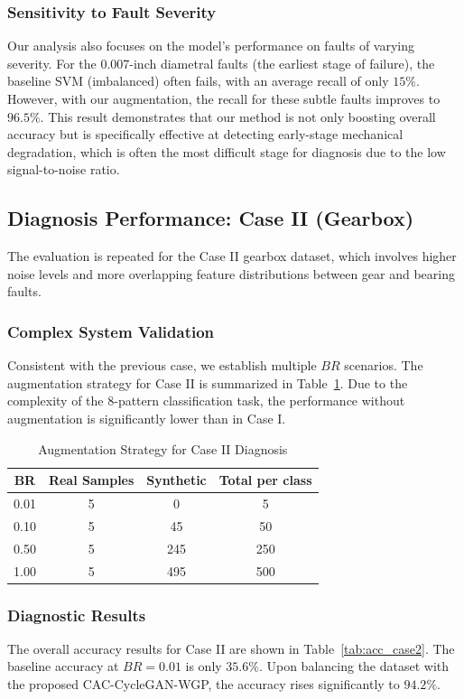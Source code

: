 \subsubsection{Sensitivity to Fault Severity}
Our analysis also focuses on the model's performance on faults of varying severity. For the 0.007-inch diametral faults (the earliest stage of failure), the baseline SVM (imbalanced) often fails, with an average recall of only $15\%$. However, with our augmentation, the recall for these subtle faults improves to $96.5\%$. This result demonstrates that our method is not only boosting overall accuracy but is specifically effective at detecting early-stage mechanical degradation, which is often the most difficult stage for diagnosis due to the low signal-to-noise ratio.

\subsection{Diagnosis Performance: Case II (Gearbox)}
The evaluation is repeated for the Case II gearbox dataset, which involves higher noise levels and more overlapping feature distributions between gear and bearing faults.

\subsubsection{Complex System Validation}
Consistent with the previous case, we establish multiple $BR$ scenarios. The augmentation strategy for Case II is summarized in Table~\ref{tab:aug_case2}. Due to the complexity of the 8-pattern classification task, the performance without augmentation is significantly lower than in Case I.

\begin{table}[htbp]
\centering
\caption{Augmentation Strategy for Case II Diagnosis}
\label{tab:aug_case2}
\begin{tabular}{cccc}
\hline
\textbf{BR} & \textbf{Real Samples} & \textbf{Synthetic} & \textbf{Total per class} \\ \hline
0.01 & 5 & 0 & 5 \\
0.10 & 5 & 45 & 50 \\
0.50 & 5 & 245 & 250 \\
1.00 & 5 & 495 & 500 \\
\hline
\end{tabular}
\end{table}

\subsubsection{Diagnostic Results}
The overall accuracy results for Case II are shown in Table~\ref{tab:acc_case2}. The baseline accuracy at $BR=0.01$ is only $35.6\%$. Upon balancing the dataset with the proposed CAC-CycleGAN-WGP, the accuracy rises significantly to $94.2\%$. 

